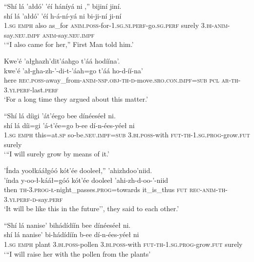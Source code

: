 \ea\label{ex:text5-6-15}
``Shí lá ’ałdó’ ’éí háníyá ni ,'' bijiní jiní.\\
\gll shí	lá	’ałdó’	’éí	h-á-ní-yá	ni	bi-ji-ní	ji-ní\\
     1.\textsc{sg}	\textsc{emph}	also	as\_for	\textsc{anim}.\textsc{poss}-for-1.\textsc{sg}.\textsc{ni}.\textsc{perf}-go.\textsc{sg}.\textsc{perf}	surely	3.\textsc{bi}-\textsc{anim}-say.\textsc{neu}.\textsc{impf}	\textsc{anim}-say.\textsc{neu}.\textsc{impf}\\
\glt `“I also came for her,'' First Man told him.'
\z

\ea\label{ex:text5-6-16}
Kwe’é ’ałghazh’dit’áahgo t’áá hodíína’.\\
\gll kwe’é	’ał-gha-zh-’-di-t-’áah=go	t’áá	ho-d-íí-na’\\
     here	\textsc{rec}.\textsc{poss}-away\_from-\textsc{anim}-\textsc{nsp}.\textsc{obj}-\textsc{th}-\textsc{d}-move.\textsc{sro}.\textsc{con}.\textsc{impf}=\textsc{sub}	\textsc{pcl}	\textsc{ar}-\textsc{th}-3.\textsc{yi}.\textsc{perf}-last.\textsc{perf}\\
\glt `For a long time they argued about this matter.'
\z

\ea\label{ex:text5-6-17}
``Shí lá díigi ’át’éego bee dínéeséeł ni.\\
\gll shí	lá	díi=gi	’á-t’ée=go	b-ee	dí-n-ées-yéeł	ni\\
     1.\textsc{sg}	\textsc{emph}	this=at.\textsc{sp}	so-be.\textsc{neu}.\textsc{impf}=\textsc{sub}	3.\textsc{bi}.\textsc{poss}-with	\textsc{fut}-\textsc{th}-1.\textsc{sg}.\textsc{prog}-grow.\textsc{fut}	surely\\
\glt `{``}I will surely grow by means of it.'
\z

\ea\label{ex:text5-6-18}
’Índa yoołkááłgóó kót’ée dooleeł,'' ’ahizhdoo’niid.\\
\gll ’índa	y-oo-ł-kááł=góó	kót’ée	dooleeł	’ahi-zh-d-oo-’-niid\\
     then	\textsc{th}-3.\textsc{prog}-\textsc{ł}-night\_passes.\textsc{prog}=towards	it\_is\_thus	\textsc{fut}	\textsc{rec}-\textsc{anim}-\textsc{th}-3.\textsc{yi}.\textsc{perf}-\textsc{d}-say.\textsc{perf}\\
\glt `It will be like this in the future'', they said to each other.'
\z

\ea\label{ex:text5-6-19}
``Shí lá nanise’ bihádídíín bee dínéeséeł ni.\\
\gll shí	lá	nanise’	bi-hádídíín	b-ee	dí-n-ées-yéeł	ni\\
     1.\textsc{sg}	\textsc{emph}	plant	3.\textsc{bi}.\textsc{poss}-pollen	3.\textsc{bi}.\textsc{poss}-with	\textsc{fut}-\textsc{th}-1.\textsc{sg}.\textsc{prog}-grow.\textsc{fut}	surely\\
\glt `{``}I will raise her with the pollen from the plants'
\z


